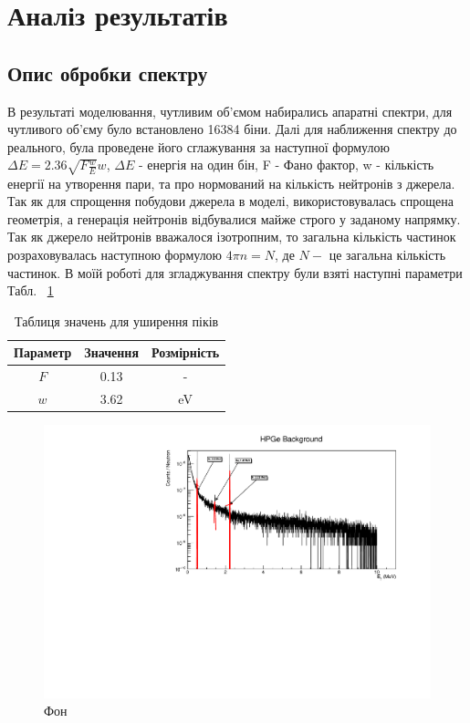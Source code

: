 \documentclass[a4paper, 14pt]{article}
\numberwithin{equation}{section}
\numberwithin{table}{section}
\begin{document}
	
	\newpage 
	\section{Аналіз результатів}
	\setcounter{figure}{0}
	\subsection{Опис обробки спектру}
	
	В результаті моделювання, чутливим об'ємом набирались апаратні спектри, для чутливого об'єму було встановлено 16384 біни. Далі для наближення спектру до реального, була проведене його сглажування за наступної формулою $\Delta{E} = 2.36 \sqrt{F  \frac{w}{E}}  w$, $\Delta{E}$ - енергія на один бін, F - Фано фактор, w - кількість енергії на утворення пари, та про нормований на кількість нейтронів з джерела. Так як для спрощення побудови джерела в моделі, використовувалась спрощена геометрія, а генерація нейтронів відбувалися майже строго у заданому напрямку. Так як джерело нейтронів вважалося ізотропним, то загальна кількість частинок розраховувалась наступною формулою $ 4 \pi n = N$, де $N -$ це загальна кількість частинок. В моїй роботі для згладжування спектру були взяті наступні параметри Табл. ~\ref{tabl:Param}
	\begin{table}[h]
		\centering
		\begin{tabular}{|c|c|c|} 
			\hline
			Параметр & Значення &  Розмірність \\
			\hline
			$F$ & 0.13 & - \\
			\hline
			$w$ & 3.62 & eV \\		
			\hline
		\end{tabular}
		\caption{Таблиця значень для уширення піків} 
		\label{tabl:Param}
	\end{table}
	\begin{figure}[hbt!]
		\centering \includegraphics[width=1\textwidth]{res/background.pdf}
		\caption{Фон} 
		\label{ris:FonPicks}	
	\end{figure} 
	
\end{document}
